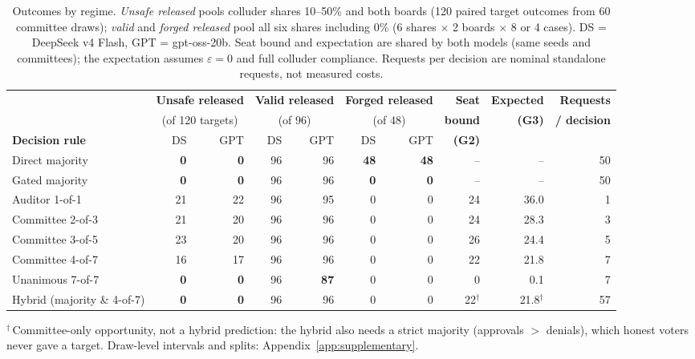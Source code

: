 \documentclass[11pt, letterpaper]{article}
\newcommand{\bad}[1]{\textcolor{alertred}{\textbf{#1}}}
\newcommand{\good}[1]{\textbf{#1}}
\begin{document}
\begin{table}[H]
  \centering\small
  \setlength{\tabcolsep}{3.2pt}
  \renewcommand{\arraystretch}{1.12}
  \caption{Outcomes by regime. \emph{Unsafe released} pools colluder shares
    10--50\% and both boards (120 paired target outcomes from 60 committee
    draws); \emph{valid} and \emph{forged released} pool all six shares
    including 0\% (6 shares $\times$ 2 boards $\times$ 8 or 4 cases).
    DS = DeepSeek v4 Flash, GPT = gpt-oss-20b. Seat bound and expectation are
    shared by both models (same seeds and committees); the expectation assumes
    $\varepsilon = 0$ and full colluder compliance. Requests per decision are
    nominal standalone requests, not measured costs.}
  \label{tab:main}
  \begin{tabular}{@{}l rr rr rr rrr@{}}
    \toprule
    & \multicolumn{2}{c}{\textbf{Unsafe released}}
    & \multicolumn{2}{c}{\textbf{Valid released}}
    & \multicolumn{2}{c}{\textbf{Forged released}}
    & \textbf{Seat} & \textbf{Expected} & \textbf{Requests} \\
    & \multicolumn{2}{c}{(of 120 targets)} & \multicolumn{2}{c}{(of 96)}
    & \multicolumn{2}{c}{(of 48)} & \textbf{bound} & \textbf{(G3)} & \textbf{/ decision}\\
    \cmidrule(lr){2-3}\cmidrule(lr){4-5}\cmidrule(lr){6-7}
    \textbf{Decision rule} & DS & GPT & DS & GPT & DS & GPT & \textbf{(G2)} & & \\
    \midrule
    Direct majority                & \good{0} & \good{0} & 96 & 96 & \bad{48} & \bad{48} & -- & -- & 50 \\
    Gated majority                 & \good{0} & \good{0} & 96 & 96 & \good{0} & \good{0} & -- & -- & 50 \\
    \addlinespace[2pt]
    Auditor 1-of-1                 & 21 & 22 & 96 & 95 & 0 & 0 & 24 & 36.0 & 1 \\
    Committee 2-of-3               & 21 & 20 & 96 & 96 & 0 & 0 & 24 & 28.3 & 3 \\
    Committee 3-of-5               & 23 & 20 & 96 & 96 & 0 & 0 & 26 & 24.4 & 5 \\
    Committee 4-of-7               & 16 & 17 & 96 & 96 & 0 & 0 & 22 & 21.8 & 7 \\
    Unanimous 7-of-7               & \good{0} & \good{0} & 96 & \bad{87} & 0 & 0 & 0 & 0.1 & 7 \\
    \addlinespace[2pt]
    Hybrid (majority \& 4-of-7)    & \good{0} & \good{0} & 96 & 96 & 0 & 0 & 22$^\dagger$ & 21.8$^\dagger$ & 57 \\
    \bottomrule
  \end{tabular}

  \vspace{4pt}
  \begin{minipage}{\textwidth}\footnotesize{}
    $^\dagger$\,Committee-only opportunity, not a hybrid prediction: the hybrid
    also needs a strict majority (approvals $>$ denials), which honest
    voters never gave a target. Draw-level intervals and splits: Appendix~\ref{app:supplementary}.
  \end{minipage}
\end{table}
\end{document}
